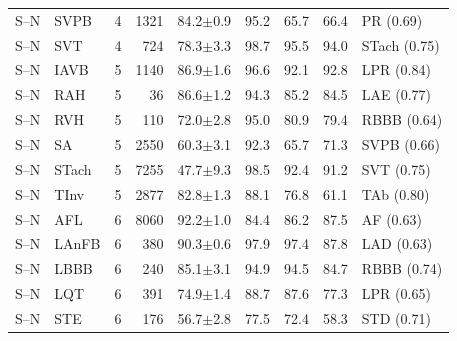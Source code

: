 \begin{longtable}{@{}llcrrrrrl@{}}
S--N & SVPB & 4 & 1321 & 84.2$\pm$0.9 & 95.2 & 65.7 & 66.4 & PR (0.69) \\
S--N & SVT & 4 & 724 & 78.3$\pm$3.3 & 98.7 & 95.5 & 94.0 & STach (0.75) \\
S--N & IAVB & 5 & 1140 & 86.9$\pm$1.6 & 96.6 & 92.1 & 92.8 & LPR (0.84) \\
S--N & RAH & 5 & 36 & 86.6$\pm$1.2 & 94.3 & 85.2 & 84.5 & LAE (0.77) \\
S--N & RVH & 5 & 110 & 72.0$\pm$2.8 & 95.0 & 80.9 & 79.4 & RBBB (0.64) \\
S--N & SA & 5 & 2550 & 60.3$\pm$3.1 & 92.3 & 65.7 & 71.3 & SVPB (0.66) \\
S--N & STach & 5 & 7255 & 47.7$\pm$9.3 & 98.5 & 92.4 & 91.2 & SVT (0.75) \\
S--N & TInv & 5 & 2877 & 82.8$\pm$1.3 & 88.1 & 76.8 & 61.1 & TAb (0.80) \\
S--N & AFL & 6 & 8060 & 92.2$\pm$1.0 & 84.4 & 86.2 & 87.5 & AF (0.63) \\
S--N & LAnFB & 6 & 380 & 90.3$\pm$0.6 & 97.9 & 97.4 & 87.8 & LAD (0.63) \\
S--N & LBBB & 6 & 240 & 85.1$\pm$3.1 & 94.9 & 94.5 & 84.7 & RBBB (0.74) \\
S--N & LQT & 6 & 391 & 74.9$\pm$1.4 & 88.7 & 87.6 & 77.3 & LPR (0.65) \\
S--N & STE & 6 & 176 & 56.7$\pm$2.8 & 77.5 & 72.4 & 58.3 & STD (0.71) \\
\end{longtable}
